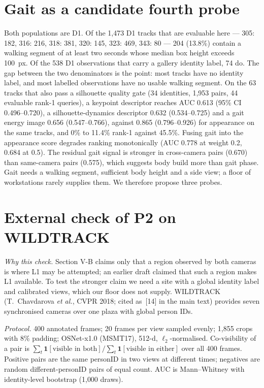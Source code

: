 \documentclass[10pt,a4paper]{article}
\begin{document}
\section{Gait as a candidate fourth probe}
Both populations are D1. Of the 1,473 D1 tracks that are evaluable here --- 305: 182, 316: 216, 318: 381, 320: 145, 323: 469, 343: 80 --- 204 (13.8\%) contain a walking segment of at least two seconds whose median box height exceeds 100~px. Of the 538 D1 observations that carry a gallery identity label, 74 do. The gap between the two denominators is the point: most tracks have no identity label, and most labelled observations have no usable walking segment. On the 63 tracks that also pass a silhouette quality gate (34 identities, 1,953 pairs, 44 evaluable rank-1 queries), a keypoint descriptor reaches AUC 0.613 (95\% CI 0.496--0.720), a silhouette-dynamics descriptor 0.632 (0.534--0.725) and a gait energy image 0.656 (0.547--0.766), against 0.865 (0.796--0.926) for appearance on the same tracks, and 0\% to 11.4\% rank-1 against 45.5\%. Fusing gait into the appearance score degrades ranking monotonically (AUC 0.778 at weight 0.2, 0.684 at 0.5). The residual gait signal is stronger in cross-camera pairs (0.670) than same-camera pairs (0.575), which suggests body build more than gait phase. Gait needs a walking segment, sufficient body height and a side view; a floor of workstations rarely supplies them. We therefore propose three probes.

\section{External check of P2 on WILDTRACK}\label{sec:supp-wildtrack}

\emph{Why this check.} Section V-B claims only that a region observed by both cameras is where L1 may be attempted; an earlier draft claimed that such a region makes L1 available. To test the stronger claim we need a site with a global identity label and calibrated views, which our floor does not supply. WILDTRACK (T.~Chavdarova \emph{et al.}, CVPR 2018; cited as~[14] in the main text) provides seven synchronised cameras over one plaza with global person IDs.

\emph{Protocol.} 400 annotated frames; 20 frames per view sampled evenly; 1{,}855 crops with 8\% padding; OSNet-x1.0 (MSMT17), 512-d, $\ell_2$-normalised. Co-visibility of a pair is $\sum_t \mathbf{1}[\text{visible in both}] / \sum_t \mathbf{1}[\text{visible in either}]$ over all 400 frames. Positive pairs are the same personID in two views at different times; negatives are random different-personID pairs of equal count. AUC is Mann--Whitney with identity-level bootstrap (1{,}000 draws).
\end{document}
